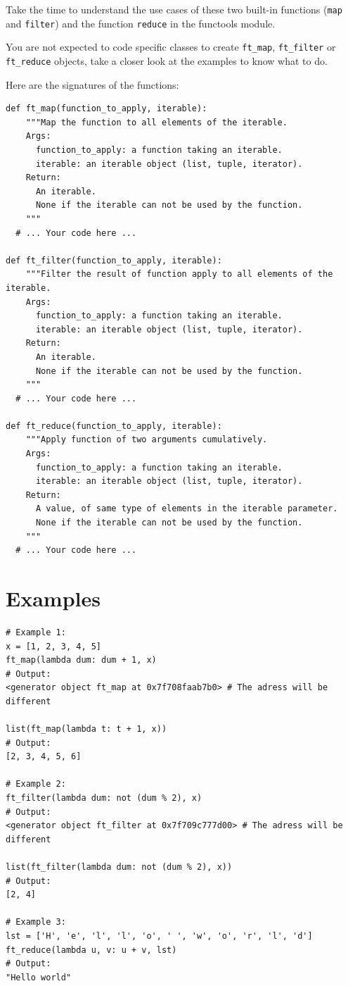 \documentclass{42-en}
\begin{document}
Take the time to understand the use cases of these two built-in functions
(\texttt{map} and \texttt{filter}) and the function \texttt{reduce} in the functools module.

You are not expected to code specific classes to create \texttt{ft\_map},
\texttt{ft\_filter} or \texttt{ft\_reduce} objects, take a closer look
at the examples to know what to do.

Here are the signatures of the functions:

\begin{verbatim}
def ft_map(function_to_apply, iterable):
	"""Map the function to all elements of the iterable.
	Args:
	  function_to_apply: a function taking an iterable.
	  iterable: an iterable object (list, tuple, iterator).
	Return:
	  An iterable.
	  None if the iterable can not be used by the function.
	"""
  # ... Your code here ...

def ft_filter(function_to_apply, iterable):
	"""Filter the result of function apply to all elements of the iterable.
	Args:
	  function_to_apply: a function taking an iterable.
	  iterable: an iterable object (list, tuple, iterator).
	Return:
	  An iterable.
	  None if the iterable can not be used by the function.
	"""
  # ... Your code here ...

def ft_reduce(function_to_apply, iterable):
	"""Apply function of two arguments cumulatively.
	Args:
	  function_to_apply: a function taking an iterable.
	  iterable: an iterable object (list, tuple, iterator).
	Return:
	  A value, of same type of elements in the iterable parameter.
	  None if the iterable can not be used by the function.
	"""
  # ... Your code here ...
\end{verbatim}

\section*{Examples}

\begin{verbatim}
# Example 1:
x = [1, 2, 3, 4, 5]
ft_map(lambda dum: dum + 1, x)
# Output:
<generator object ft_map at 0x7f708faab7b0> # The adress will be different

list(ft_map(lambda t: t + 1, x))
# Output:
[2, 3, 4, 5, 6]

# Example 2:
ft_filter(lambda dum: not (dum % 2), x)
# Output:
<generator object ft_filter at 0x7f709c777d00> # The adress will be different

list(ft_filter(lambda dum: not (dum % 2), x))
# Output:
[2, 4]

# Example 3:
lst = ['H', 'e', 'l', 'l', 'o', ' ', 'w', 'o', 'r', 'l', 'd']
ft_reduce(lambda u, v: u + v, lst)
# Output:
"Hello world"
\end{verbatim}
\end{document}
